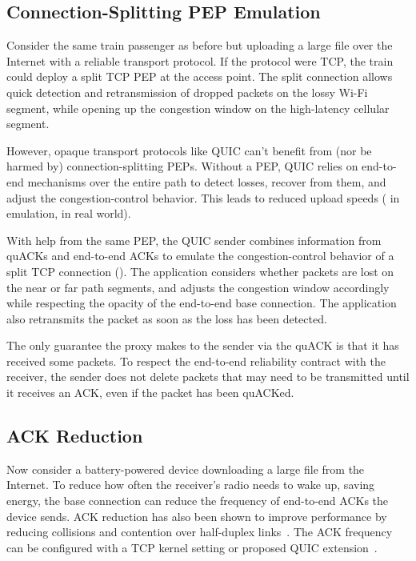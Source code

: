 \subsection{Connection-Splitting PEP Emulation}

Consider the same train passenger as before but uploading a large file over the
Internet with a reliable transport protocol. If the protocol were
TCP, the train could deploy a split TCP PEP at the access point.
The split connection allows quick detection and retransmission of dropped
packets on the lossy Wi-Fi segment, while opening
up the congestion window on the high-latency cellular segment.

However, opaque transport protocols like QUIC can't benefit from (nor be harmed
by) connection-splitting PEPs. Without a PEP, QUIC relies on end-to-end
mechanisms over the entire path to detect losses, recover from them, and adjust
the congestion-control behavior. This leads to reduced upload speeds
( in emulation,  in real world).

With help from the same \sys PEP, the QUIC sender combines
information from quACKs and end-to-end ACKs to emulate the congestion-control
behavior of a split TCP connection (). The application
considers whether packets are lost on the near or far path segments, and
adjusts the congestion window accordingly while respecting the opacity of the
end-to-end base connection. The application also retransmits the packet as soon
as the loss has been detected.

The only guarantee the proxy makes to the sender via the quACK is that it
has received some packets.
To respect the end-to-end reliability contract with the receiver, the sender
does not delete packets that may need to be transmitted until it receives an
ACK, even if the packet has been quACKed.

\subsection{ACK Reduction}

Now consider a battery-powered device downloading a large file from the
Internet. To reduce how often the receiver's
radio needs to wake up, saving energy, the base connection can reduce the
frequency of end-to-end ACKs the device sends.
ACK reduction has also been shown to improve performance by reducing collisions
and contention over half-duplex links~\cite{custura2023reducing,li2020tack}.
The ACK frequency can be configured with a TCP kernel setting or proposed
QUIC extension~\cite{ietf-quic-ack-frequency-07}.

